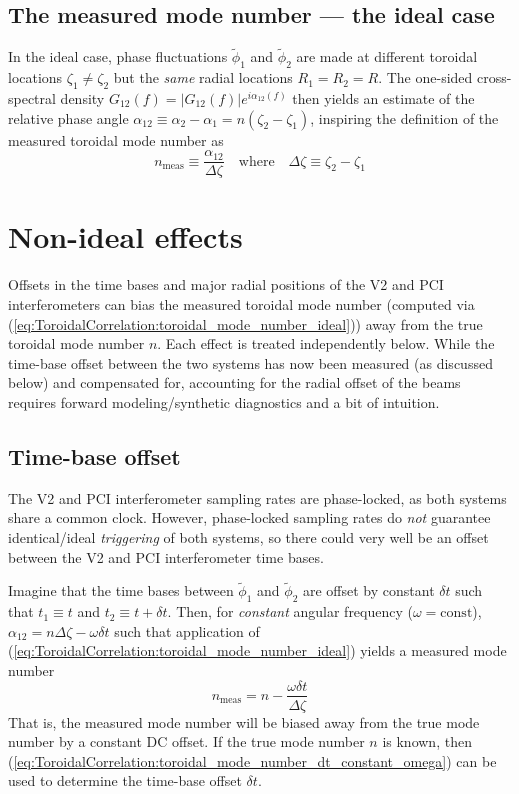 \subsection{The measured mode number --- the ideal case}
In the ideal case, phase fluctuations $\tilde{\phi}_1$ and $\tilde{\phi}_2$
are made at different toroidal locations $\zeta_1 \neq \zeta_2$ but
the \emph{same} radial locations $R_1 = R_2 = R$.
The one-sided cross-spectral density
$G_{12}(f) = |G_{12}(f)| e^{i \alpha_{12}(f)}$
then yields an estimate of the relative phase angle
$\alpha_{12} \equiv \alpha_2 - \alpha_1 = n(\zeta_2 - \zeta_1)$,
inspiring the definition of the measured toroidal mode number as
\begin{equation}
  n_{\text{meas}}
  \equiv
  \frac{\alpha_{12}}{\Delta \zeta}
  \quad \text{where} \quad
  \Delta \zeta \equiv \zeta_2 - \zeta_1
  \label{eq:ToroidalCorrelation:toroidal_mode_number_ideal}
\end{equation}


\section{Non-ideal effects}
\label{sec:ToroidalCorrelation:nonideal_effects}
Offsets in the time bases and major radial positions
of the V2 and PCI interferometers can bias
the measured toroidal mode number
(computed via (\ref{eq:ToroidalCorrelation:toroidal_mode_number_ideal}))
away from the true toroidal mode number $n$.
Each effect is treated independently below.
While the time-base offset between the two systems
has now been measured (as discussed below) and compensated for,
accounting for the radial offset of the beams requires
forward modeling/synthetic diagnostics and a bit of intuition.


\subsection{Time-base offset}
The V2 and PCI interferometer sampling rates are phase-locked,
as both systems share a common clock.
However, phase-locked sampling rates do \emph{not} guarantee
identical/ideal \emph{triggering} of both systems, so
there could very well be an offset between the
V2 and PCI interferometer time bases.

Imagine that the time bases between $\tilde{\phi}_1$ and $\tilde{\phi}_2$
are offset by constant $\delta t$ such that
$t_1 \equiv t$ and $t_2 \equiv t + \delta t$.
Then, for \emph{constant} angular frequency ($\omega = \text{const}$),
$\alpha_{12} = n \Delta \zeta - \omega \delta t$
such that application of
(\ref{eq:ToroidalCorrelation:toroidal_mode_number_ideal})
yields a measured mode number
\begin{equation}
  n_{\text{meas}} = n - \frac{\omega \delta t}{\Delta \zeta}
  \label{eq:ToroidalCorrelation:toroidal_mode_number_dt_constant_omega}
\end{equation}
That is, the measured mode number will be biased away from
the true mode number by a constant DC offset.
If the true mode number $n$ is known,
then (\ref{eq:ToroidalCorrelation:toroidal_mode_number_dt_constant_omega})
can be used to determine the time-base offset $\delta t$.

